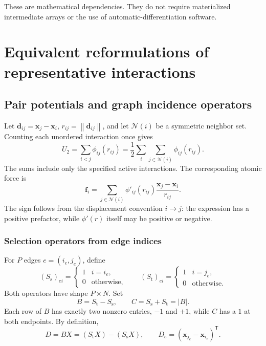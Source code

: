 \documentclass[11pt,a4paper]{article}
\newcommand{\norm}[1]{\left\lVert #1\right\rVert}
\newcommand{\vect}[1]{\bm{#1}}
\newcommand{\src}{S_{\mathrm s}}
\newcommand{\dst}{S_{\mathrm t}}
\theoremstyle{definition}
\begin{document}
These are mathematical dependencies. They do not require materialized intermediate arrays or the
use of automatic-differentiation software.


\section{Equivalent reformulations of representative interactions}
\label{sec:models}
\subsection{Pair potentials and graph incidence operators}
\label{sec:pair}

Let $\vect d_{ij}=\vect x_j-\vect x_i$, $r_{ij}=\norm{\vect d_{ij}}$, and let $\mathcal N(i)$ be
a symmetric neighbor set. Counting each unordered interaction once gives
\begin{equation}
U_2=\sum_{i<j}\phi_{ij}(r_{ij})
=\frac12\sum_i\sum_{j\in\mathcal N(i)}\phi_{ij}(r_{ij}).
\label{eq:pair-traditional-energy}
\end{equation}
The sums include only the specified active interactions. The corresponding atomic force is
\begin{equation}
\vect f_i=\sum_{j\in\mathcal N(i)}
\phi'_{ij}(r_{ij})\frac{\vect x_j-\vect x_i}{r_{ij}}.
\label{eq:pair-traditional-force}
\end{equation}
The sign follows from the displacement convention $i\to j$: the expression has a positive
prefactor, while $\phi'(r)$ itself may be positive or negative.


\subsubsection{Selection operators from edge indices}
For $P$ edges $e=(i_e,j_e)$, define
\begin{equation}
(\src)_{ei}=\begin{cases}1&i=i_e,\\0&\text{otherwise},\end{cases}
\qquad
(\dst)_{ei}=\begin{cases}1&i=j_e,\\0&\text{otherwise}.\end{cases}
\end{equation}
Both operators have shape $P\times N$. Set
\begin{equation}
B=\dst-\src,\qquad C=\src+\dst=|B|.
\label{eq:incidence}
\end{equation}
Each row of $B$ has exactly two nonzero entries, $-1$ and $+1$, while $C$ has a $1$ at both
endpoints. By definition,
\begin{equation}
D=BX=(\dst X)-(\src X),\qquad D_e=(\vect x_{j_e}-\vect x_{i_e})^{\mathsf T}.
\label{eq:edge-difference}
\end{equation}
\end{document}
